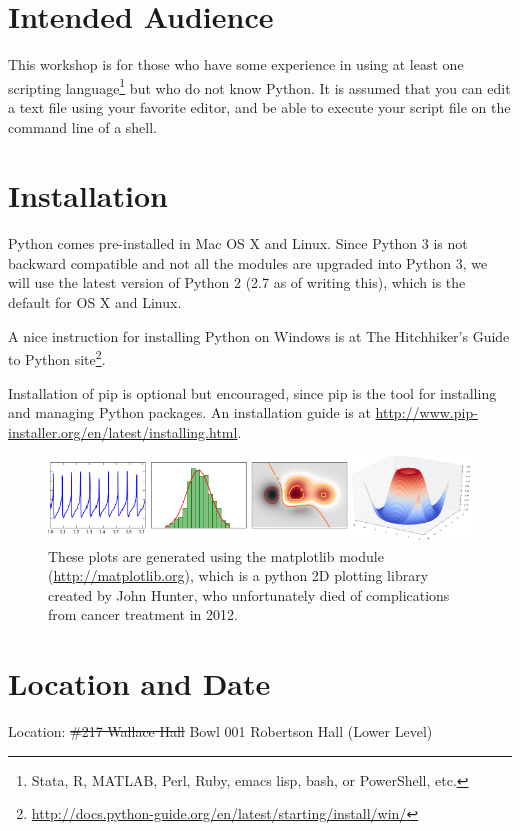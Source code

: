 \documentclass{tufte-handout}
\begin{document}
\section{Intended Audience}\label{sec:intended_audience}
This workshop is for those who have some experience in using at least
one scripting language\footnote{Stata, R, MATLAB, Perl, Ruby, emacs
lisp, bash, or PowerShell, etc.} but who do not know Python. It is
assumed that you can edit a text file using your favorite editor, and be
able to execute your script file on the command line of a shell.

\section{Installation}\label{sec:installation}
Python comes pre-installed in Mac OS X and Linux. Since Python 3 is not
backward compatible and not all the modules are upgraded into Python 3,
we will use the latest version of Python 2 (2.7 as of writing this), 
which is the default for OS X and Linux.

A nice instruction for installing Python on Windows is at The
Hitchhiker's Guide to Python
site\footnote{\url{http://docs.python-guide.org/en/latest/starting/install/win/}}.

Installation of pip is optional but encouraged, since pip is the tool for
installing and managing Python packages. An installation guide is
at \url{http://www.pip-installer.org/en/latest/installing.html}.

\begin{figure}[ht]
  \includegraphics[width=0.8\linewidth]{matplotlib.png}%
  \caption{These plots are generated using the matplotlib module
    (\url{http://matplotlib.org}), which is a python 2D
    plotting library created by John Hunter, who unfortunately
    died of complications from cancer treatment in 2012.}%
  \label{fig:Matplotlib Plot Examples}%
\end{figure}

\section{Location and Date}\label{sec:location_and_date}
\noindent Location: \st{\#217 Wallace Hall}
   Bowl 001 Robertson Hall (Lower Level)
\end{document}
